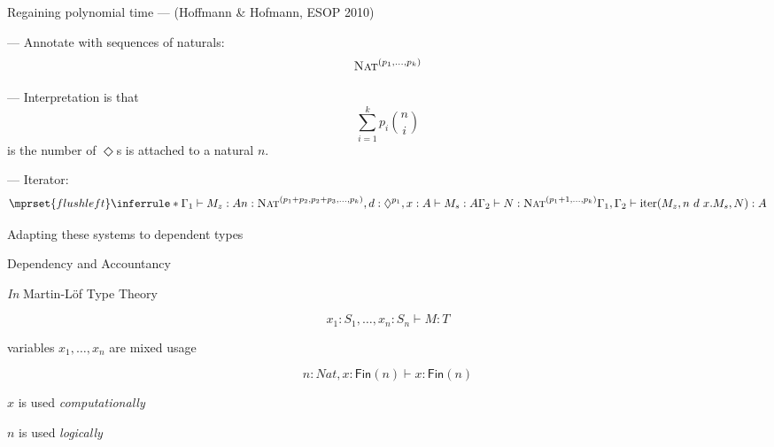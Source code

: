 \documentclass[xetex,serif,mathserif,aspectratio=169]{beamer}
\newcommand{\youtem}{\quad \textcolor{titlered!80}{---} \quad}
\newcommand{\titlecard}[1]{\begin{frame}%
  \begin{center}%
    \Large \textcolor{titlered}{#1}%
  \end{center}%
\end{frame}}
\newcommand{\HEAD}[1]{\textcolor{titlered}{#1}}
\begin{document}
\begin{frame}
  \HEAD{Regaining polynomial time} ---
  \quad \qquad \textcolor{black!60}{(Hoffmann \& Hofmann, ESOP 2010)}

  \bigskip

  \youtem Annotate with sequences of naturals:
  \begin{displaymath}
    \textsc{Nat}^{(p_1, \dots, p_k)}
  \end{displaymath}

  \youtem Interpretation is that
  \begin{displaymath}
    \sum_{i=1}^kp_i{n \choose i}
  \end{displaymath}
  \qquad \quad is the number of $\Diamond$s is attached to a natural $n$.

  \pause
  \medskip

  \youtem Iterator:
  \begin{displaymath}
    \mprset{flushleft}
    \inferrule*
    {\Gamma_1 \vdash M_z : A \\\\
      n : \TyNat^{(p_1+p_2,p_2+p_3,\dots,p_k)}, d : \Diamond^{p_1}, x : A \vdash M_s : A \\\\
      \Gamma_2 \vdash N : \TyNat^{(p_1+1,\dots,p_k)}}
    {\Gamma_1, \Gamma_2 \vdash \mathrm{iter}(M_z, n~d~x.M_s,N) : A}
  \end{displaymath}
\end{frame}

\titlecard{Adapting these systems to dependent types}

\titlecard{Dependency and Accountancy}

\begin{frame}
  \emph{In} Martin-L{\"o}f Type Theory

  \bigskip

  \begin{displaymath}
    x_1 : S_1, \dots, x_n : S_n \vdash M : T
  \end{displaymath}

  \pause
  \bigskip

  \begin{center}
    variables $x_1, \dots, x_n$ are mixed usage
  \end{center}
\end{frame}

\begin{frame}
  \begin{displaymath}
    n : \mathit{Nat}, x : \mathsf{Fin}(n) \vdash x : \mathsf{Fin}(n)
  \end{displaymath}

  \pause
  \bigskip

  \hspace{15.5em}$x$ is used \textcolor{titlered}{\emph{computationally}}

  \pause
  \bigskip

  \hspace{12em}$n$ is used \textcolor{titlered}{\it logically}
\end{frame}
\end{document}

